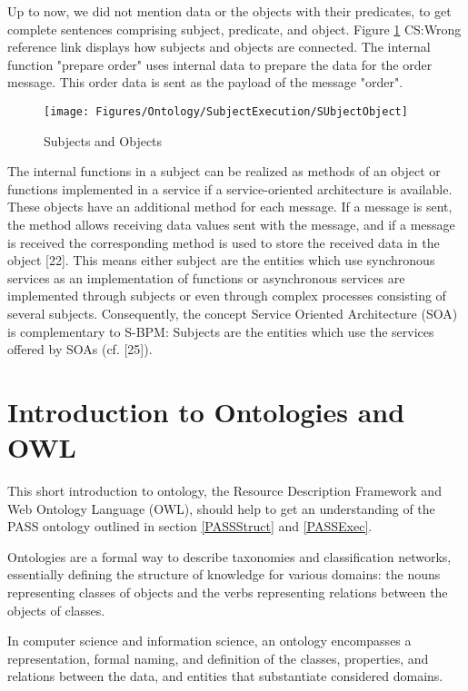 Up to now, we did not mention data or the objects with their predicates, to get complete sentences comprising subject, predicate, and object. Figure \ref{fig:subjectobject} CS:Wrong reference link displays how subjects and objects are connected. The internal function "prepare order" uses internal data to prepare the data for the order message. This order data is sent as the payload of the message "order".

\begin{figure}[htbp]
	\centering
	\texttt{[image: Figures/Ontology/SubjectExecution/SUbjectObject]}
	\label{fig:subjectobject}
	\caption[Subjects and Objects]{Subjects and Objects}
\end{figure}

The internal functions in a subject can be realized as methods of an object or functions implemented in a service if a service-oriented architecture is available. These objects have an additional method for each message. If a message is sent, the method allows receiving data values sent with the message, and if a message is received the corresponding method is used to store the received data in the object [22]. This means either subject are the entities which use synchronous services as an implementation of functions or asynchronous services are implemented through subjects or even through complex processes consisting of several subjects. Consequently, the concept Service Oriented Architecture (SOA) is complementary to S-BPM: Subjects are the entities which use the services offered by SOAs (cf. [25]).

\section{Introduction to Ontologies and OWL }
\label{IntroOntology}

This short introduction to ontology, the Resource Description Framework and Web Ontology Language (OWL), should help to get an understanding of the PASS ontology outlined in section \ref{PASSStruct} and \ref{PASSExec}.

Ontologies are a formal way to describe taxonomies and classification networks, essentially defining the structure of knowledge for various domains: the nouns representing classes of objects and the verbs representing relations between the objects of classes.

In computer science and information science, an ontology encompasses a representation, formal naming, and definition of the classes, properties, and relations between the data, and entities that substantiate considered domains.

